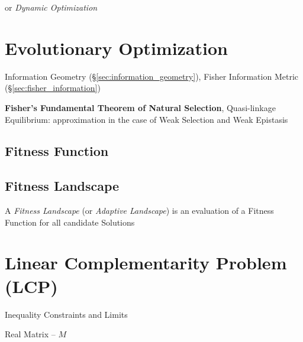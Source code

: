 or \emph{Dynamic Optimization}



\section{Evolutionary Optimization}\label{sec:evolutionary_optimization}

\fist Information Geometry (\S\ref{sec:information_geometry}), Fisher
Information Metric (\S\ref{sec:fisher_information})

\fist \textbf{Fisher's Fundamental Theorem of Natural Selection},
Quasi-linkage Equilibrium: approximation in the case of Weak Selection
and Weak Epistasis %



\subsection{Fitness Function}\label{sec:fitness_function}

\subsection{Fitness Landscape}\label{sec:fitness_landscape}

A \emph{Fitness Landscape} (or \emph{Adaptive Landscape}) is an
evaluation of a Fitness Function for all candidate Solutions %



\section{Linear Complementarity Problem (LCP)}
\label{sec:linear_complementarity}


Inequality Constraints and Limits %

Real Matrix -- $M$

